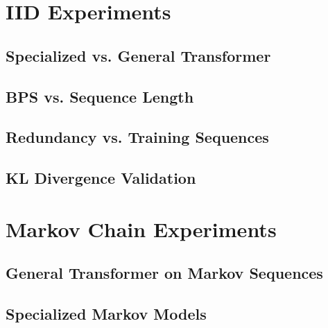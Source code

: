 \documentclass[conference]{IEEEtran}
\begin{document}
\section{IID Experiments}

\subsection{Specialized vs. General Transformer}


\subsection{BPS vs. Sequence Length}


\subsection{Redundancy vs. Training Sequences}


\subsection{KL Divergence Validation}


\section{Markov Chain Experiments}

\subsection{General Transformer on Markov Sequences}


\subsection{Specialized Markov Models}

\end{document}
